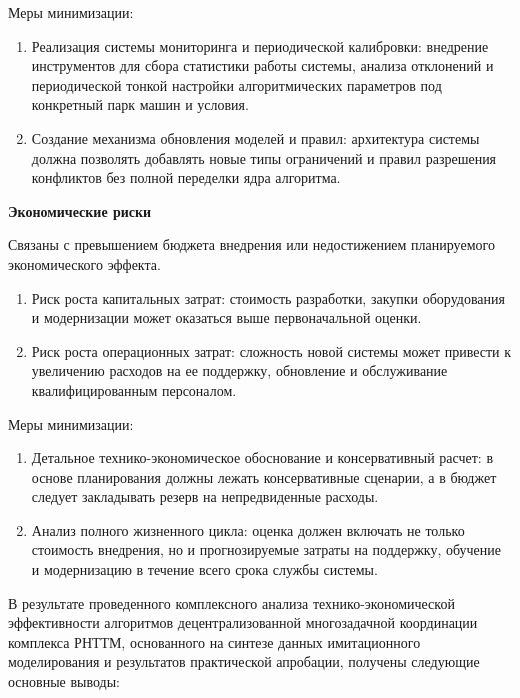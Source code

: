 Меры минимизации:
\begin{enumerate}[beginpenalty=10000, midpenalty=10000, wide=\parindent, leftmargin=0pt]
	\item Реализация системы мониторинга и периодической калибровки: внедрение инструментов для сбора статистики работы системы, анализа отклонений и периодической тонкой настройки алгоритмических параметров под конкретный парк машин и условия.
	\item Создание механизма обновления моделей и правил: архитектура системы должна позволять добавлять новые типы ограничений и правил разрешения конфликтов без полной переделки ядра алгоритма.
\end{enumerate}

\textbf{Экономические риски}

Связаны с превышением бюджета внедрения или недостижением планируемого экономического эффекта.

\begin{enumerate}[beginpenalty=10000, midpenalty=10000, wide=\parindent, leftmargin=0pt]
	\item Риск роста капитальных затрат: стоимость разработки, закупки оборудования и модернизации может оказаться выше первоначальной оценки.
	\item Риск роста операционных затрат: сложность новой системы может привести к увеличению расходов на ее поддержку, обновление и обслуживание квалифицированным персоналом.
\end{enumerate}

Меры минимизации:
\begin{enumerate}[beginpenalty=10000, midpenalty=10000, wide=\parindent, leftmargin=0pt]
	\item Детальное технико-экономическое обоснование и консервативный расчет: в основе планирования должны лежать консервативные сценарии, а в бюджет следует закладывать резерв на непредвиденные расходы.
	\item Анализ полного жизненного цикла: оценка должен включать не только стоимость внедрения, но и прогнозируемые затраты на поддержку, обучение и модернизацию в течение всего срока службы системы.
\end{enumerate}


В результате проведенного комплексного анализа технико-экономической эффективности алгоритмов децентрализованной многозадачной координации комплекса РНТТМ, основанного на синтезе данных имитационного моделирования и результатов практической апробации, получены следующие основные выводы:

